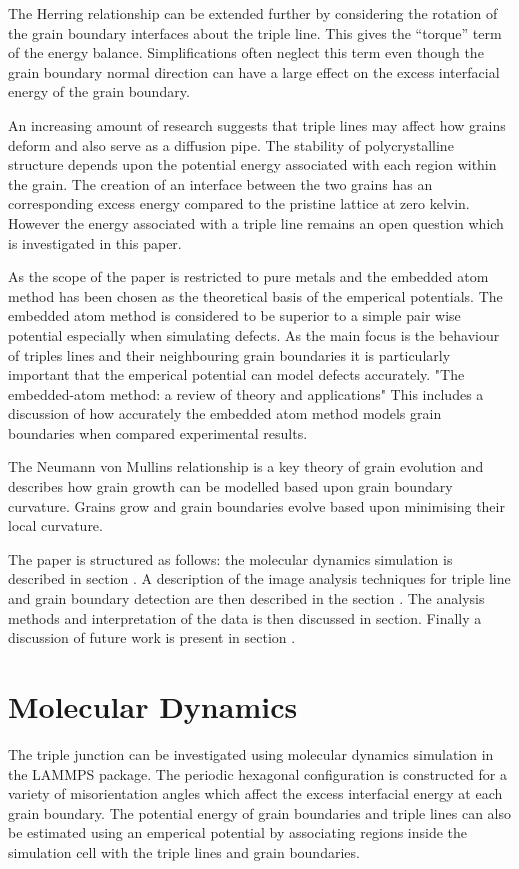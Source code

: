 \documentclass[12pt,a4paper]{book}
\begin{document}
The Herring relationship can be extended further by considering the rotation of the grain boundary interfaces about the triple line. This gives the ``torque'' term of the energy balance. Simplifications often neglect this term even though the grain boundary normal direction can have a large effect on the excess interfacial energy of the grain boundary.

An increasing amount of research suggests that triple lines may affect how  grains deform and also serve as a diffusion pipe. The stability of polycrystalline structure depends upon the potential energy associated with each region within the grain. The creation of an interface between the two grains has an corresponding excess energy compared to the pristine lattice at zero kelvin. However the energy associated with a triple line remains an open question which is investigated in this paper.

As the scope of the paper is restricted to pure metals and the embedded atom method has been chosen as the theoretical basis of the emperical potentials. The embedded atom method is considered to be superior to a simple pair wise potential especially when simulating defects. As the main focus is the behaviour of triples lines and their neighbouring grain boundaries it is particularly important that the emperical potential can model defects accurately. "The embedded-atom method:
a review of theory and applications" This includes a discussion of how accurately the embedded atom method models grain boundaries when compared  experimental results.

The Neumann von Mullins relationship is a key theory of grain evolution and describes how grain growth can be modelled based upon grain boundary curvature. Grains grow and grain boundaries evolve based upon minimising their local curvature.  

The paper is structured as follows: the molecular dynamics simulation is described in section . A description of the image analysis techniques for triple line and grain boundary detection are then described in the section . The analysis methods and interpretation of the data is then discussed in section. Finally a  discussion of future work is present in section .

 


\chapter{Molecular Dynamics}
The triple junction can be investigated using molecular dynamics simulation in the LAMMPS package. The periodic hexagonal configuration is constructed for a variety of misorientation angles which affect the excess interfacial energy at each grain boundary. The potential energy of grain boundaries and triple lines can also be estimated using an emperical potential by associating regions inside the simulation cell with the triple lines and grain boundaries.
\end{document}
